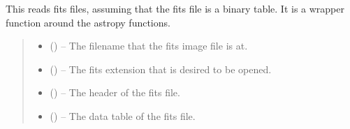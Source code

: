 \documentclass[letterpaper,11pt,english]{sphinxmanual}
\begin{document}

\begin{savenotes}\begin{fulllineitems}
\label{\detokenize{code/opihiexarata.library.fits:opihiexarata.library.fits.read_fits_table_file}}
\pysigstartsignatures
{}
\pysigstopsignatures
\sphinxAtStartPar
This reads fits files, assuming that the fits file is a binary table.
It is a wrapper function around the astropy functions.
\begin{quote}\begin{description}
\begin{itemize}
\item {} 
\sphinxAtStartPar
{} () – The filename that the fits image file is at.

\item {} 
\sphinxAtStartPar
{} (\sphinxstyleliteralemphasis{\sphinxupquote{, }}) – The fits extension that is desired to be opened.

\end{itemize}

\sphinxAtStartPar
\begin{itemize}
\item {} 
\sphinxAtStartPar
{} () – The header of the fits file.

\item {} 
\sphinxAtStartPar
{} () – The data table of the fits file.

\end{itemize}


\end{description}\end{quote}

\end{fulllineitems}\end{savenotes}
\end{document}
